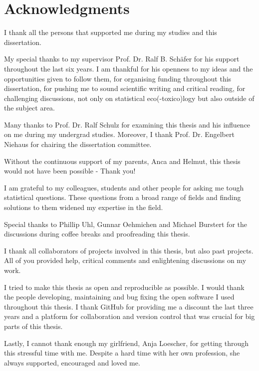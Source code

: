 


\begingroup
\let\clearpage\relax
\let\cleardoublepage\relax
\let\cleardoublepage\relax

\chapter*{Acknowledgments}
\thispagestyle{empty}

I thank all the persons that supported me during my studies and this dissertation.

\noindent My special thanks to my supervisor Prof. Dr. Ralf B. Schäfer for his support throughout the last six years. 
I am thankful for his openness to my ideas and the opportunities given to follow them, 
for organising funding throughout this dissertation, 
for pushing me to sound scientific writing and critical reading, 
for challenging discussions, not only on statistical eco(-toxico)logy but also outside of the subject area.

\noindent Many thanks to Prof. Dr. Ralf Schulz for examining this thesis and his influence on me during my undergrad studies.
Moreover, I thank Prof. Dr. Engelbert Niehaus for chairing the dissertation committee.

\noindent Without the continuous support of my parents, Anca and Helmut, this thesis would not have been possible - Thank you!

\noindent I am grateful to my colleagues, students and other people for asking me tough statistical questions. 
These questions from a broad range of fields and finding solutions to them widened my expertise in the field.

\noindent Special thanks to Phillip Uhl, Gunnar Oehmichen and Michael Burstert for the discussions during coffee breaks and proofreading this thesis.

\noindent I thank all collaborators of projects involved in this thesis, but also past projects. All of you provided help, critical comments and enlightening discussions on my work.

\noindent I tried to make this thesis as open and reproducible as possible. I would thank the people developing, maintaining and bug fixing the open software I used throughout this thesis. I thank GitHub for providing me a discount the last three years and a platform for collaboration and version control that was crucial for big parts of this thesis. 

\noindent Lastly, I cannot thank enough my girlfriend, Anja Loescher, for getting through this stressful time with me.
Despite a hard time with her own profession, she always supported, encouraged and loved me. 


\endgroup 
